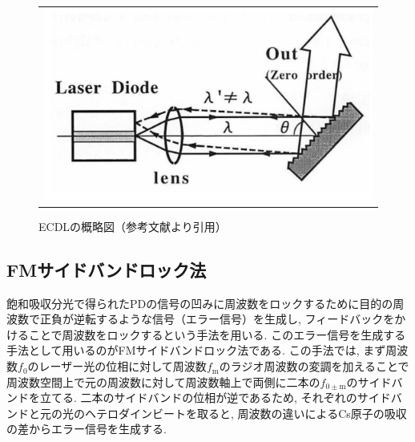 \documentclass[uplatex, dvipdfmx, a4paper, report, papersize, 11pt]{jsbook}
\begin{document}
\begin{figure}[htpb]
  \centering
    \begin{tabular}{c}
      \begin{minipage}{1\hsize}
        \centering
          \includegraphics[keepaspectratio,  scale=0.35,  angle=0]
                          {figures/saturated-absorption/ECDL_diagram.png}
                          \caption{ECDLの概略図（参考文献\cite{ECDL}より引用）}
                          \label{ECDL_diagram}
      \end{minipage}
    \end{tabular}
\end{figure}
\subsection{FMサイドバンドロック法}
飽和吸収分光で得られたPDの信号の凹みに周波数をロックするために目的の周波数で正負が逆転するような信号（エラー信号）を生成し, フィードバックをかけることで周波数をロックするという手法を用いる. このエラー信号を生成する手法として用いるのがFMサイドバンドロック法である. この手法では, まず周波数$f_\mathrm{0}$のレーザー光の位相に対して周波数$f_\mathrm{m}$のラジオ周波数の変調を加えることで周波数空間上で元の周波数に対して周波数軸上で両側に二本の$f_\mathrm{0\pm m}$のサイドバンドを立てる. 二本のサイドバンドの位相が逆であるため, それぞれのサイドバンドと元の光のヘテロダインビートを取ると, 周波数の違いによるCs原子の吸収の差からエラー信号を生成する.
\end{document}
